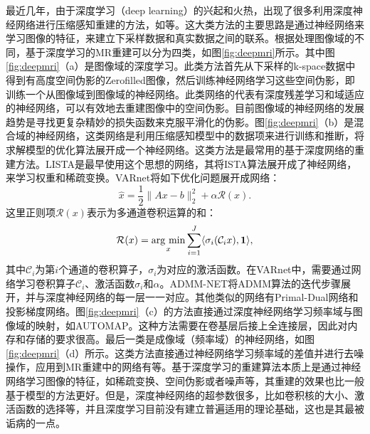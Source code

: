 最近几年，由于深度学习\cite{lecun2015deep,schmidhuber2015deep}（deep learning）的兴起和火热，出现了很多利用深度神经网络进行压缩感知重建的方法，如\cite{jin2017deep,admmnet,wang2016accelerating,lee2018deep,han2018deep,zhu2018image,unetcs,varnet,gannet}等。这大类方法的主要思路是通过神经网络来学习图像的特征，来建立下采样数据和真实数据之间的联系。根据处理图像域的不同，基于深度学习的MR重建可以分为四类，如图\ref{fig:deepmri}所示。其中图\ref{fig:deepmri}（a）是图像域的深度学习。此类方法首先从下采样的k-space数据中得到有高度空间伪影的Zerofilled图像，然后训练神经网络学习这些空间伪影，即训练一个从图像域到图像域的神经网络。此类网络的代表有深度残差学习\cite{lee2018deep}和域适应的神经网络\cite{han2018deep}，可以有效地去重建图像中的空间伪影。目前图像域的神经网络的发展趋势是寻找更复杂精妙的损失函数来克服平滑化的伪影。图\ref{fig:deepmri}（b）是混合域的神经网络，这类网络是利用压缩感知模型中的数据项来进行训练和推断，将求解模型的优化算法展开成一个神经网络。这类方法是最常用的基于深度网络的重建方法。LISTA\cite{gregor2010learning}是最早使用这个思想的网络，其将ISTA算法\cite{beck2009fast}展开成了神经网络，来学习权重和稀疏变换。VARnet\cite{varnet}将如下优化问题展开成网络：
\begin{equation}
	\hat{x}=\frac{1}{2}\|Ax-b\|_2^2+\alpha\mathcal{R}(x).
\end{equation}
这里正则项$\mathcal{R}(x)$表示为多通道卷积运算的和：
\begin{equation}
	\mathcal{R}(x)=\argmin_x\sum_{i=1}^J\langle \sigma_i(\mathcal{C}_ix),\textbf{1}\rangle,
\end{equation}
其中$\mathcal{C}_i$为第$i$个通道的卷积算子，$\sigma_i$为对应的激活函数。在VARnet中，需要通过网络学习卷积算子$\mathcal{C}_i$、激活函数$\sigma_i$和$\alpha$。ADMM-NET\cite{admmnet}将ADMM算法的迭代步骤展开，并与深度神经网络的每一层一一对应。其他类似的网络有Primal-Dual\cite{adler2018learned}网络和投影梯度\cite{gupta2018cnn}网络。图\ref{fig:deepmri}（c）的方法直接通过深度神经网络学习频率域与图像域的映射，如AUTOMAP\cite{zhu2018image}。这种方法需要在卷基层后接上全连接层，因此对内存和存储的要求很高。最后一类是成像域（频率域）的神经网络，如图\ref{fig:deepmri}（d）所示。这类方法直接通过神经网络学习频率域的差值并进行去噪操作，应用到MR重建中的网络有\cite{han2019k,lee2019k}等。基于深度学习的重建算法本质上是通过神经网络学习图像的特征，如稀疏变换、空间伪影或者噪声等，其重建的效果也比一般基于模型的方法更好。但是，深度神经网络的超参数很多，比如卷积核的大小、激活函数的选择等，并且深度学习目前没有建立普遍适用的理论基础，这也是其最被诟病的一点。
